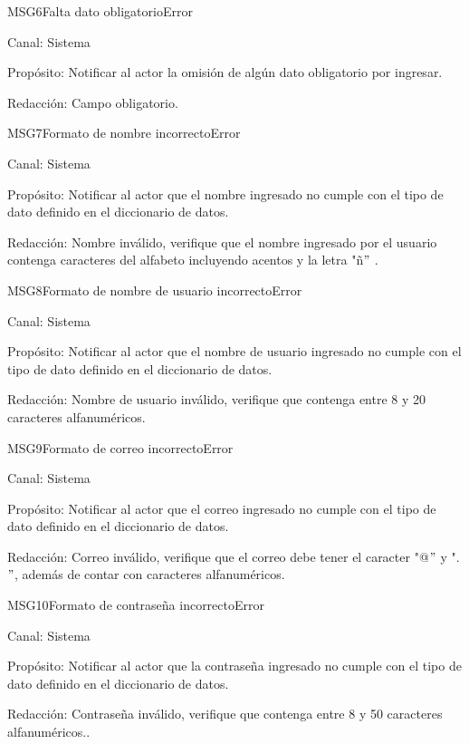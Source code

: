 \begin{mensaje}{MSG6}{Falta dato obligatorio}{Error}
	\item[Canal:] Sistema
	\item[Propósito:] Notificar al actor la omisión de algún dato obligatorio por ingresar.
	\item[Redacción:] Campo obligatorio.
\end{mensaje}

\begin{mensaje}{MSG7}{Formato de nombre incorrecto}{Error}
	\item[Canal:] Sistema
	\item[Propósito:] Notificar al actor que el nombre ingresado no cumple con el tipo de dato definido en el diccionario de datos.
	\item[Redacción:] Nombre inválido, verifique que el nombre ingresado por el usuario contenga caracteres del alfabeto incluyendo acentos y la letra "ñ$"$  .
\end{mensaje}

\begin{mensaje}{MSG8}{Formato de nombre de usuario incorrecto}{Error}
	\item[Canal:] Sistema
	\item[Propósito:] Notificar al actor que el nombre de usuario ingresado no cumple con el tipo de dato definido en el diccionario de datos.
	\item[Redacción:] Nombre de usuario inválido, verifique que 
	contenga entre 8 y 20 caracteres alfanuméricos.
\end{mensaje}

\begin{mensaje}{MSG9}{Formato de correo incorrecto}{Error}
	\item[Canal:] Sistema
	\item[Propósito:] Notificar al actor que el correo ingresado no cumple con el tipo de dato definido en el diccionario de datos.
	\item[Redacción:] Correo inválido, verifique que el correo debe tener el caracter "@$"$ y ".$"$, además de contar con caracteres alfanuméricos.
\end{mensaje}

\begin{mensaje}{MSG10}{Formato de contraseña incorrecto}{Error}
\item[Canal:] Sistema
\item[Propósito:] Notificar al actor que la contraseña ingresado no cumple con el tipo de dato definido en el diccionario de datos.
\item[Redacción:] Contraseña inválido, verifique que contenga entre 8 y 50 caracteres alfanuméricos..
\end{mensaje}

